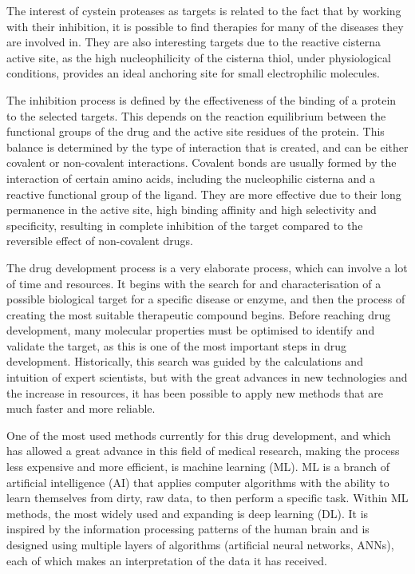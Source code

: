 \documentclass[final,times,twocolumn,article]{elsarticle}
\begin{document}
The interest of cystein proteases as targets is related to the fact that by working with their inhibition, it is possible to find therapies for many of the diseases they are involved in. They are also interesting targets due to the reactive cisterna active site, as the high nucleophilicity of the cisterna thiol, under physiological conditions, provides an ideal anchoring site for small electrophilic molecules. \cite{Maurais2019} 

The inhibition process is defined by the effectiveness of the binding of a protein to the selected targets. This depends on the reaction equilibrium between the functional groups of the drug and the active site residues of the protein. This balance is determined by the type of interaction that is created, and can be either covalent or non-covalent interactions. 
Covalent bonds are usually formed by the interaction of certain amino acids, including the nucleophilic cisterna and a reactive functional group of the ligand. They are more effective due to their long permanence in the active site, high binding affinity and high selectivity and specificity, resulting in complete inhibition of the target compared to the reversible effect of non-covalent drugs. \cite{Aljoundi2020} 

The drug development process is a very elaborate process, which can involve a lot of time and resources. It begins with the search for and characterisation of a possible biological target for a specific disease or enzyme, and then the process of creating the most suitable therapeutic compound begins. Before reaching drug development, many molecular properties must be optimised to identify and validate the target, as this is one of the most important steps in drug development. \cite{Hughes2011}
Historically, this search was guided by the calculations and intuition of expert scientists, but with the great advances in new technologies and the increase in resources, it has been possible to apply new methods that are much faster and more reliable. \cite{Hop2018}

One of the most used methods currently for this drug development, and which has allowed a great advance in this field of medical research, making the process less expensive and more efficient, is machine learning (ML). ML is a branch of artificial intelligence (AI) that applies computer algorithms with the ability to learn themselves from dirty, raw data, to then perform a specific task. Within ML methods, the most widely used and expanding is deep learning (DL). It is inspired by the information processing patterns of the human brain and is designed using multiple layers of algorithms (artificial neural networks, ANNs), each of which makes an interpretation of the data it has received. \cite{Alzubaidi2021} 
\end{document}
